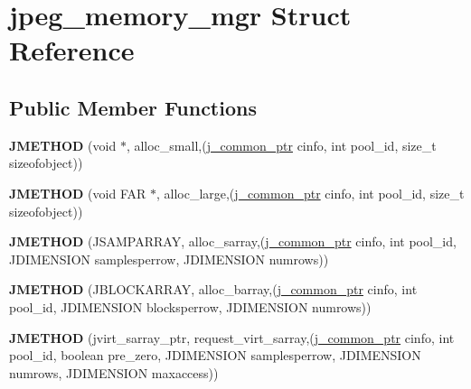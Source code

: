 \hypertarget{structjpeg__memory__mgr}{\section{jpeg\-\_\-memory\-\_\-mgr Struct Reference}
\label{structjpeg__memory__mgr}
}
\subsection*{Public Member Functions}
\begin{DoxyCompactItemize}
\item 
\hypertarget{structjpeg__memory__mgr_a9372ad24444dda23175cc9203105911c}{{\bfseries J\-M\-E\-T\-H\-O\-D} (void $\ast$, alloc\-\_\-small,(\hyperlink{structjpeg__common__struct}{j\-\_\-common\-\_\-ptr} cinfo, int pool\-\_\-id, size\-\_\-t sizeofobject))}\label{structjpeg__memory__mgr_a9372ad24444dda23175cc9203105911c}

\item 
\hypertarget{structjpeg__memory__mgr_a130f6dbc700cc045bdbe35beff2cb326}{{\bfseries J\-M\-E\-T\-H\-O\-D} (void F\-A\-R $\ast$, alloc\-\_\-large,(\hyperlink{structjpeg__common__struct}{j\-\_\-common\-\_\-ptr} cinfo, int pool\-\_\-id, size\-\_\-t sizeofobject))}\label{structjpeg__memory__mgr_a130f6dbc700cc045bdbe35beff2cb326}

\item 
\hypertarget{structjpeg__memory__mgr_a3fdd2e1dfdc089fd61f17b608c0263f2}{{\bfseries J\-M\-E\-T\-H\-O\-D} (J\-S\-A\-M\-P\-A\-R\-R\-A\-Y, alloc\-\_\-sarray,(\hyperlink{structjpeg__common__struct}{j\-\_\-common\-\_\-ptr} cinfo, int pool\-\_\-id, J\-D\-I\-M\-E\-N\-S\-I\-O\-N samplesperrow, J\-D\-I\-M\-E\-N\-S\-I\-O\-N numrows))}\label{structjpeg__memory__mgr_a3fdd2e1dfdc089fd61f17b608c0263f2}

\item 
\hypertarget{structjpeg__memory__mgr_aefc8abe884dab5648c1e4e7ada2e2e18}{{\bfseries J\-M\-E\-T\-H\-O\-D} (J\-B\-L\-O\-C\-K\-A\-R\-R\-A\-Y, alloc\-\_\-barray,(\hyperlink{structjpeg__common__struct}{j\-\_\-common\-\_\-ptr} cinfo, int pool\-\_\-id, J\-D\-I\-M\-E\-N\-S\-I\-O\-N blocksperrow, J\-D\-I\-M\-E\-N\-S\-I\-O\-N numrows))}\label{structjpeg__memory__mgr_aefc8abe884dab5648c1e4e7ada2e2e18}

\item 
\hypertarget{structjpeg__memory__mgr_a34b830d9d7b2f4fd043e98421a700503}{{\bfseries J\-M\-E\-T\-H\-O\-D} (jvirt\-\_\-sarray\-\_\-ptr, request\-\_\-virt\-\_\-sarray,(\hyperlink{structjpeg__common__struct}{j\-\_\-common\-\_\-ptr} cinfo, int pool\-\_\-id, boolean pre\-\_\-zero, J\-D\-I\-M\-E\-N\-S\-I\-O\-N samplesperrow, J\-D\-I\-M\-E\-N\-S\-I\-O\-N numrows, J\-D\-I\-M\-E\-N\-S\-I\-O\-N maxaccess))}\label{structjpeg__memory__mgr_a34b830d9d7b2f4fd043e98421a700503}


\end{DoxyCompactItemize}
